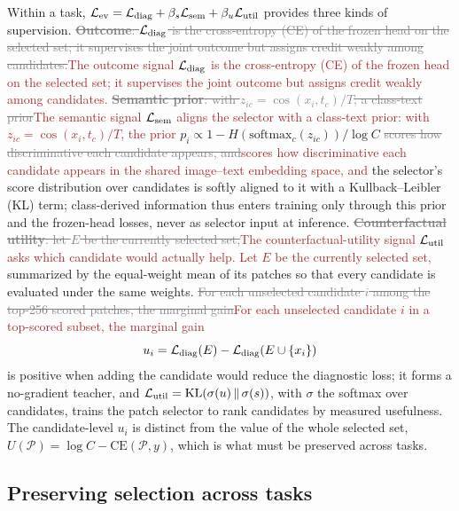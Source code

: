 \documentclass{article}
\newif\ifmarkup \markuptrue
\newcommand{\repc}[3]{\ifmarkup\textcolor{gray}{\sout{#2}}\textcolor{#1}{#3}\else#3\fi}
\newcommand{\repB}[2]{\repc{brown}{#1}{#2}}   %
\def\L{{\cal L}}
\newcommand{\Psel}{\mathcal{P}}
\begin{document}
Within a task, $\L_{\mathrm{ev}}=\L_{\mathrm{diag}}+\beta_s\L_{\mathrm{sem}}+\beta_u\L_{\mathrm{util}}$ provides three kinds of supervision. \repB{\textbf{Outcome}: $\L_{\mathrm{diag}}$ is the cross-entropy (CE) of the frozen head on the selected set; it supervises the joint outcome but assigns credit weakly among candidates.}{The outcome signal $\L_{\mathrm{diag}}$ is the cross-entropy (CE) of the frozen head on the selected set; it supervises the joint outcome but assigns credit weakly among candidates.} \repB{\textbf{Semantic prior}: with $z_{ic}=\cos(x_i,t_c)/T$, a class-text prior}{The semantic signal $\L_{\mathrm{sem}}$ aligns the selector with a class-text prior: with $z_{ic}=\cos(x_i,t_c)/T$, the prior} $p_i\propto 1-H(\mathrm{softmax}_c(z_{ic}))/\log C$ \repB{scores how discriminative each candidate appears, and}{scores how discriminative each candidate appears in the shared image--text embedding space, and} the selector's score distribution over candidates is softly aligned to it with a Kullback--Leibler (KL) term; class-derived information thus enters training only through this prior and the frozen-head losses, never as selector input at inference. \repB{\textbf{Counterfactual utility}: let $E$ be the currently selected set,}{The counterfactual-utility signal $\L_{\mathrm{util}}$ asks which candidate would actually help. Let $E$ be the currently selected set,} summarized by the equal-weight mean of its patches so that every candidate is evaluated under the same weights. \repB{For each unselected candidate $i$ among the top-256 scored patches, the marginal gain}{For each unselected candidate $i$ in a top-scored subset, the marginal gain}
\begin{equation}
u_i
=
\L_{\mathrm{diag}}(E)
-
\L_{\mathrm{diag}}(E\cup\{x_i\})
\label{eq:ui}
\end{equation}
is positive when adding the candidate would reduce the diagnostic loss; it forms a no-gradient teacher, and $\L_{\mathrm{util}}=\mathrm{KL}(\sigma(u)\,\Vert\,\sigma(s))$, with $\sigma$ the softmax over candidates, trains the patch selector to rank candidates by measured usefulness. The candidate-level $u_i$ is distinct from the value of the whole selected set, $U(\Psel)=\log C-\mathrm{CE}(\Psel,y)$, which is what must be preserved across tasks.

\subsection{Preserving selection across tasks}
\label{ssec:cl}
\end{document}
